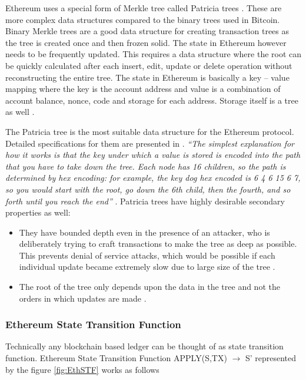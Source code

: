 Ethereum uses a special form of Merkle tree called Patricia trees \cite{ethwiki:007}. These are more complex data structures compared to the binary trees used in Bitcoin. Binary Merkle trees are a good data structure for creating transaction trees as the tree is created once and then frozen solid. The state in Ethereum however needs to be frequently updated. This requires a data structure where the root can be quickly calculated after each insert, edit, update or delete operation without reconstructing the entire tree. The state in Ethereum is basically a key – value mapping where the key is the account address and value is a combination of account balance, nonce, code and storage for each address. Storage itself is a tree as well \cite{misc:025}.
  
The Patricia tree is the most suitable data structure for the Ethereum protocol. Detailed specifications for them are presented in \cite{ethwiki:007}. \textit{“The simplest explanation for how it works is that the key under which a value is stored is encoded into the path that you have to take down the tree. Each node has 16 children, so the path is determined by hex encoding: for example, the key dog hex encoded is 6 4 6 15 6 7, so you would start with the root, go down the 6th child, then the fourth, and so forth until you reach the end”} \cite{misc:025}. Patricia trees have highly desirable secondary properties as well: 
 
\begin{itemize}
\item They have bounded depth even in the presence of an attacker, who is deliberately trying to craft transactions to make the tree as deep as possible. This prevents denial of service attacks, which would be possible if each individual update became extremely slow due to large size of the tree \cite{misc:025}.  
\item The root of the tree only depends upon the data in the tree and not the orders in which updates are made \cite{misc:025}.
\end{itemize}
\clearpage

\subsubsection{Ethereum State Transition Function}
Technically any blockchain based ledger can be thought of as state transition function. Ethereum State Transition Function APPLY(S,TX) $\rightarrow$ S’ represented by the figure \ref{fig:EthSTF} works as follows \cite{eth:001}

